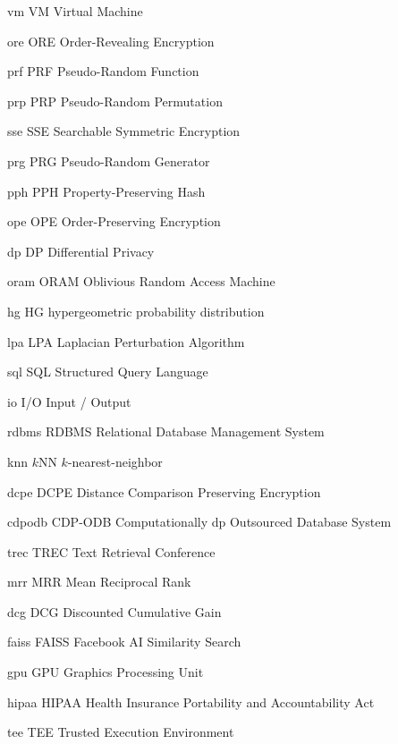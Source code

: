 
\newacronym%
	{vm}
	{VM}
	{Virtual Machine}

\newacronym%
	{ore}
	{ORE}
	{Order-Revealing Encryption}

\newacronym%
	{prf}
	{PRF}
	{Pseudo-Random Function}

\newacronym%
	{prp}
	{PRP}
	{Pseudo-Random Permutation}

\newacronym%
	{sse}
	{SSE}
	{Searchable Symmetric Encryption}

\newacronym%
	{prg}
	{PRG}
	{Pseudo-Random Generator}

\newacronym%
	{pph}
	{PPH}
	{Property-Preserving Hash}

\newacronym%
	{ope}
	{OPE}
	{Order-Preserving Encryption}

\newacronym%
	{dp}
	{DP}
	{Differential Privacy}

\newacronym%
	{oram}
	{ORAM}
	{Oblivious Random Access Machine}

\newacronym%
	{hg}
	{HG}
	{hypergeometric probability distribution}

\newacronym%
	{lpa}
	{LPA}
	{Laplacian Perturbation Algorithm}

\newacronym%
	{sql}
	{SQL}
	{Structured Query Language}

\newacronym%
	{io}
	{I/O}
	{Input / Output}

\newacronym%
	{rdbms}
	{RDBMS}
	{Relational Database Management System}

\newacronym%
	{knn}
	{\ensuremath{k}NN}
	{$k$-nearest-neighbor}

\newacronym%
	{dcpe}
	{DCPE}
	{Distance Comparison Preserving Encryption}

\newacronym%
	{cdpodb}
	{CDP-ODB}
	{Computationally \acrshort{dp} Outsourced Database System}

\newacronym%
	{trec}
	{TREC}
	{Text Retrieval Conference}

\newacronym%
	{mrr}
	{MRR}
	{Mean Reciprocal Rank}

\newacronym%
	{dcg}
	{DCG}
	{Discounted Cumulative Gain}

\newacronym%
	{faiss}
	{FAISS}
	{Facebook AI Similarity Search}

\newacronym%
	{gpu}
	{GPU}
	{Graphics Processing Unit}

\newacronym%
	{hipaa}
	{HIPAA}
	{Health Insurance Portability and Accountability Act}

\newacronym%
	{tee}
	{TEE}
	{Trusted Execution Environment}


